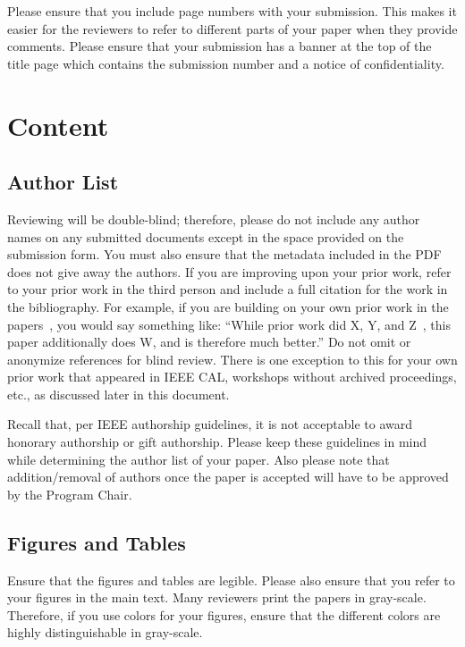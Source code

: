 \documentclass{sig-alternate}
\begin{document}
Please ensure that you include page numbers with your submission. This makes it easier for the reviewers to refer to different parts of your paper when they provide comments. Please ensure that your submission has a banner at the top of the title page which contains the submission number and a notice of confidentiality.

\section{Content}

\subsection{Author List}  Reviewing will be double-blind; therefore, please do not include any author names on any submitted documents except in the space provided on the submission form. You must also ensure that the metadata included in the PDF does not give away the authors. If you are improving upon your prior work, refer to your prior work in the third person and include a full citation for the work in the bibliography. For example, if you are building on your own prior work in the papers~\cite{nicepaper1,nicepaper2,nicepaper3}, you would say something like: ``While prior work did X, Y, and Z~\cite{nicepaper1,nicepaper2,nicepaper3}, this paper additionally does W, and is therefore much better.'' Do not omit or anonymize references for blind review. There is one exception to this for your own prior work that appeared in IEEE CAL, workshops without archived proceedings, etc., as discussed later in this document.

Recall that, per IEEE authorship guidelines, it is not acceptable to award honorary authorship or gift authorship. Please keep these guidelines in mind while determining the author list of your paper. Also please note that addition/removal of authors once the paper is accepted will have to be approved by the Program Chair.

\subsection{Figures and Tables}

Ensure that the figures and tables are legible. Please also ensure that you refer to your figures in the main text. Many reviewers print the papers in gray-scale. Therefore, if you use colors for your figures, ensure that the different colors are highly distinguishable in gray-scale.
\end{document}
